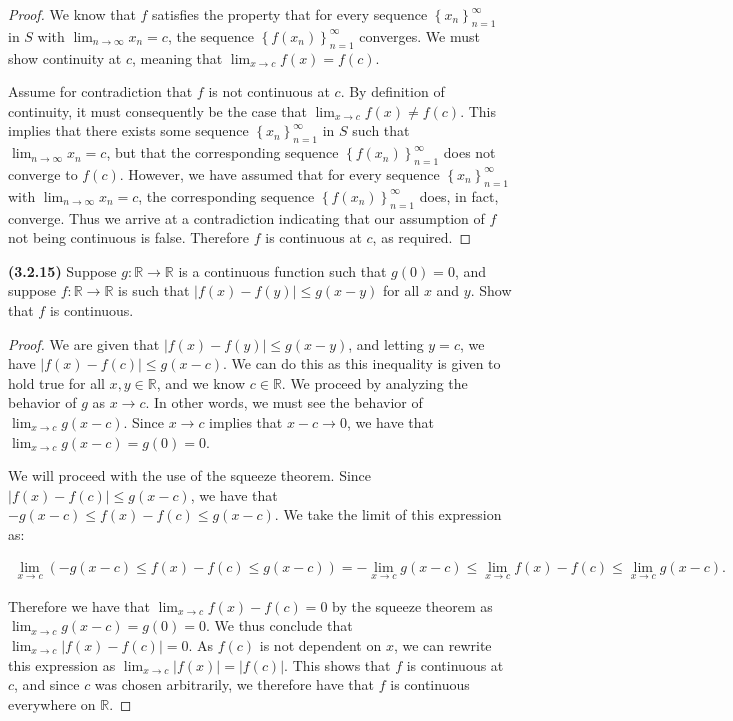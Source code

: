 \documentclass[12pt]{article}
\newcommand{\limit}[1]{\displaystyle \lim_{ {#1} }}
\newcommand{\limtoinf}[1][n]{\displaystyle\lim_{ {#1} \to \infty}}
\newcommand{\abs}[1]{\left| {#1} \right|}
\newcommand{\seq}[2][n]{\left\{ {#2} \right\}_{#1=1}^\infty}
\newcommand{\paren}[1]{\left( {#1} \right)}
\newcommand{\bR}{\mathbb{R}}
\begin{document}
\begin{proof}
	We know that $f$ satisfies the property that for every sequence $\seq{x_n}$ in $S$ with $\limtoinf x_n=c$, the sequence $\seq{f(x_n)}$ converges. We must show continuity at $c$, meaning that $\limit{x\to c}f(x)=f(c)$.
	
\indent Assume for contradiction that $f$ is not continuous at $c$. By definition of continuity, it must consequently be the case that $\limit{x\to c}f(x)\neq f(c)$. This implies that there exists some sequence $\seq{x_n}$ in $S$ such that $\limtoinf x_n=c$, but that the corresponding sequence $\seq{f(x_n)}$ does not converge to $f(c)$. However, we have assumed that for every sequence $\seq{x_n}$ with $\limtoinf x_n=c$, the corresponding sequence $\seq{f(x_n)}$ does, in fact, converge. Thus we arrive at a contradiction indicating that our assumption of $f$ not being continuous is false. Therefore $f$ is continuous at $c$, as required.
\end{proof}

\newpage

\noindent \textbf{(3.2.15)} Suppose $g:\bR\to\bR$ is a continuous function such that $g(0)=0$, and suppose $f:\bR\to\bR$ is such that $\abs{f(x)-f(y)}\le g(x-y)$ for all $x$ and $y$. Show that $f$ is continuous.

\begin{proof}
	We are given that $\abs{f(x)-f(y)}\le g(x-y)$, and letting $y=c$, we have $\abs{f(x)-f(c)}\le g(x-c)$. We can do this as this inequality is given to hold true for all $x,y\in\bR$, and we know $c\in\bR$. We proceed by analyzing the behavior of $g$ as $x\to c$. In other words, we must see the behavior of $\limit{x\to c}g(x-c)$. Since $x\to c$ implies that $x-c\to 0$, we have that $\limit{x\to c}g(x-c)=g(0)=0$.

\indent We will proceed with the use of the squeeze theorem. Since $\abs{f(x)-f(c)}\le g(x-c)$, we have that $-g(x-c)\le f(x)-f(c)\le g(x-c)$. We take the limit of this expression as:

\begin{align*}
	\limit{x\to c}\paren{-g(x-c)\le f(x)-f(c)\le g(x-c)}=-\limit{x\to c}g(x-c)\le\limit{x\to c}f(x)-f(c)\le\limit{x\to c}g(x-c).
\end{align*}

\noindent Therefore we have that $\limit{x\to c}f(x)-f(c)=0$ by the squeeze theorem as $\limit{x\to c}g(x-c)=g(0)=0$. We thus conclude that $\limit{x\to c}\abs{f(x)-f(c)}=0$. As $f(c)$ is not dependent on $x$, we can rewrite this expression as $\limit{x\to c}\abs{f(x)}=\abs{f(c)}$. This shows that $f$ is continuous at $c$, and since $c$ was chosen arbitrarily, we therefore have that $f$ is continuous everywhere on $\bR$.
\end{proof}
\end{document}
